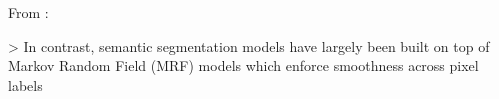 













From \cite{yang2012layered}:

> In contrast, semantic segmentation models have largely been built on top of
Markov Random Field (MRF) models which enforce smoothness across pixel labels


